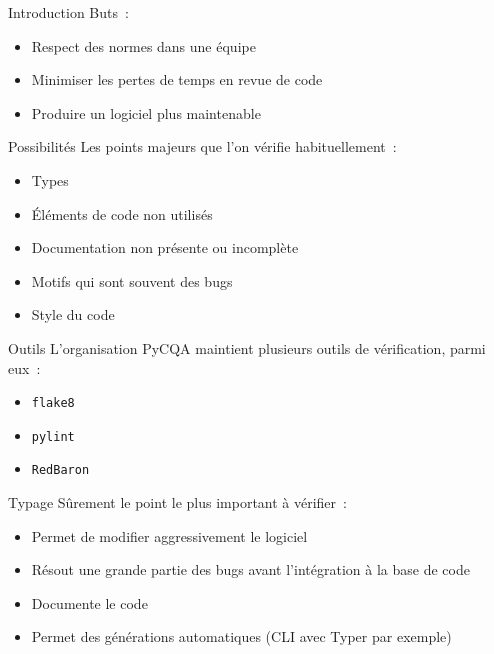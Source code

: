 \begin{frame}{Introduction}
  Buts~:
  \begin{itemize}[<+->]
    \item Respect des normes dans une équipe
    \item Minimiser les pertes de temps en revue de code
    \item Produire un logiciel plus maintenable
  \end{itemize}
\end{frame}

\begin{frame}{Possibilités}
  Les points majeurs que l'on vérifie habituellement~:

  \begin{itemize}[<+->]
    \item Types
    \item Éléments de code non utilisés
    \item Documentation non présente ou incomplète
    \item Motifs qui sont souvent des bugs
    \item Style du code
  \end{itemize}
\end{frame}

\begin{frame}{Outils}
  L'organisation PyCQA maintient plusieurs outils de vérification, parmi eux~:

  \begin{itemize}[<+->]
    \item \texttt{flake8}
    \item \texttt{pylint}
    \item \texttt{RedBaron}
  \end{itemize}

\end{frame}

\begin{frame}{Typage}
  Sûrement le point le plus important à vérifier~:

  \begin{itemize}[<+->]
    \item Permet de modifier aggressivement le logiciel
    \item Résout une grande partie des bugs avant l'intégration à la base de code
    \item Documente le code
    \item Permet des générations automatiques (CLI avec Typer par exemple)
  \end{itemize}

\end{frame}

